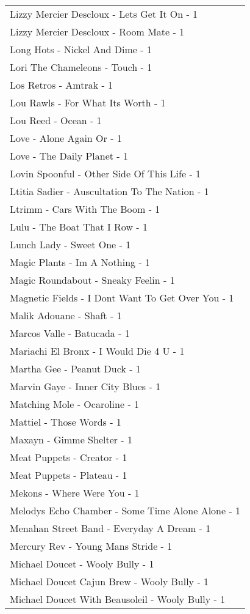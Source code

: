 \documentclass[
]{article}
\begin{document}
\begin{longtable}{l}
Lizzy Mercier Descloux - Lets Get It On - 1 \\ 
Lizzy Mercier Descloux - Room Mate - 1 \\ 
Long Hots - Nickel And Dime - 1 \\ 
Lori The Chameleons - Touch - 1 \\ 
Los Retros - Amtrak - 1 \\ 
Lou Rawls - For What Its Worth - 1 \\ 
Lou Reed - Ocean - 1 \\ 
Love - Alone Again Or - 1 \\ 
Love - The Daily Planet - 1 \\ 
Lovin Spoonful - Other Side Of This Life - 1 \\ 
Ltitia Sadier - Auscultation To The Nation - 1 \\ 
Ltrimm - Cars With The Boom - 1 \\ 
Lulu - The Boat That I Row - 1 \\ 
Lunch Lady - Sweet One - 1 \\ 
Magic Plants - Im A Nothing - 1 \\ 
Magic Roundabout - Sneaky Feelin - 1 \\ 
Magnetic Fields - I Dont Want To Get Over You - 1 \\ 
Malik Adouane - Shaft - 1 \\ 
Marcos Valle - Batucada - 1 \\ 
Mariachi El Bronx - I Would Die 4 U - 1 \\ 
Martha Gee - Peanut Duck - 1 \\ 
Marvin Gaye - Inner City Blues - 1 \\ 
Matching Mole - Ocaroline - 1 \\ 
Mattiel - Those Words - 1 \\ 
Maxayn - Gimme Shelter - 1 \\ 
Meat Puppets - Creator - 1 \\ 
Meat Puppets - Plateau - 1 \\ 
Mekons - Where Were You - 1 \\ 
Melodys Echo Chamber - Some Time Alone Alone - 1 \\ 
Menahan Street Band - Everyday A Dream - 1 \\ 
Mercury Rev - Young Mans Stride - 1 \\ 
Michael Doucet - Wooly Bully - 1 \\ 
Michael Doucet Cajun Brew - Wooly Bully - 1 \\ 
Michael Doucet With Beausoleil - Wooly Bully - 1 \\ 

\end{longtable}
\end{document}
